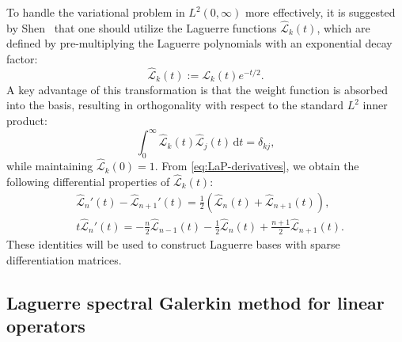\documentclass[a4paper,fleqn, 12pt]{cas-sc}
\newcommand{\LaF}{\widehat{\mathscr{L}}}
\newcommand{\LaP}{{\mathscr{L}}}
\numberwithin{table}{section}
\begin{document}
To handle the variational problem in $L^2(0, \infty)$ more effectively, it is suggested by Shen~\cite{Shen2000StableEfficient} that one should utilize the Laguerre functions $\LaF_k(t)$, which are defined by pre-multiplying the Laguerre polynomials with an exponential decay factor:
\begin{equation}\label{eq:LaF}
    \LaF_k(t) := \LaP_k(t) e^{-t/2}.
\end{equation}
A key advantage of this transformation is that the weight function is absorbed into the basis, resulting in orthogonality with respect to the standard $L^2$ inner product:
\[
    \int_0^{\infty} \LaF_k(t) \LaF_j(t) \,\mathrm{d}t = \delta_{kj},
\]
while maintaining $\LaF_k(0) = 1$. From \eqref{eq:LaP-derivatives}, we obtain the following differential properties of $\LaF_k(t)$:
\begin{equation}\label{eq:LaF_diff}
\begin{aligned}
    & \LaF_n'(t) - \LaF_{n+1}'(t) = \frac{1}{2} (\LaF_n(t) + \LaF_{n+1}(t)), \\
    & t \LaF_n'(t) = -\frac{n}{2} \LaF_{n-1}(t) - \frac{1}{2} \LaF_n(t) + \frac{n+1}{2} \LaF_{n+1}(t).
\end{aligned}
\end{equation}
These identities will be used to construct Laguerre bases with sparse differentiation matrices.

\subsection{Laguerre spectral Galerkin method for linear operators}
\end{document}
